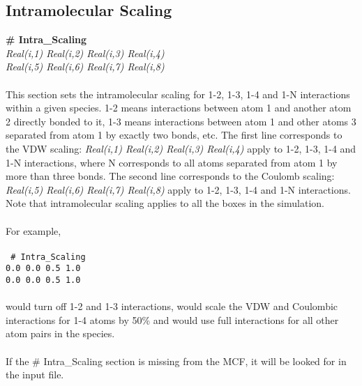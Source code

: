 \subsection{Intramolecular Scaling}\label{sec:Intra_Scaling}
{\bf \# Intra\_Scaling} \\
{\it Real(i,1) Real(i,2) Real(i,3) Real(i,4)} \\
{\it Real(i,5) Real(i,6) Real(i,7) Real(i,8)} \\ \\
%
This section sets the intramolecular scaling for 1-2, 1-3, 1-4 and 1-N
interactions within a given species. 1-2 means interactions between
atom 1 and another atom 2 directly bonded to it, 1-3 means
interactions between atom 1 and other atoms 3 separated from atom 1 by
exactly two bonds, etc. The first line corresponds to the
VDW scaling: {\it Real(i,1) Real(i,2) Real(i,3) Real(i,4)} apply to
1-2, 1-3, 1-4 and 1-N interactions, where N corresponds to all atoms
separated from atom 1 by more than three bonds.
The second line corresponds to the Coulomb scaling:
{\it Real(i,5)  Real(i,6) Real(i,7) Real(i,8)} apply to 1-2, 1-3, 1-4 and 1-N interactions.
Note that intramolecular scaling applies to all the boxes in the simulation. \\ \\
%
For example, \\ \\
\texttt{
\# Intra\_Scaling \\
0.0 0.0 0.5 1.0 \\
0.0 0.0 0.5 1.0}
\\ \\
would turn off 1-2 and 1-3 interactions, would scale the VDW and
Coulombic interactions for 1-4 atoms by 50\% and would use full
interactions for all other atom pairs in the species. \\ \\
%
If the \# Intra\_Scaling section is missing from the MCF,
it will be looked for in the input file. \\ \\
%
